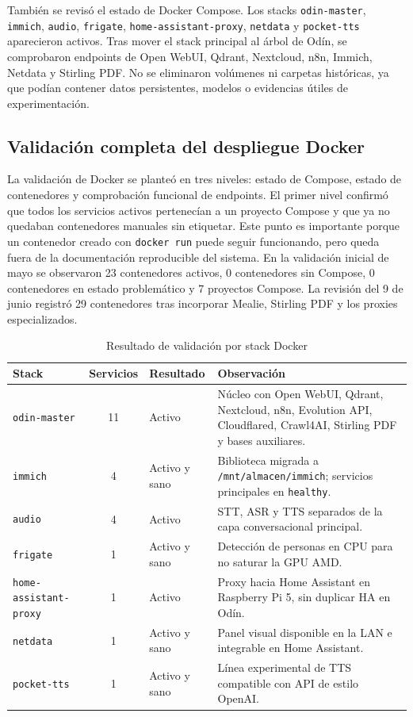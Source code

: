 También se revisó el estado de Docker Compose. Los stacks \texttt{odin-master}, \texttt{immich}, \texttt{audio}, \texttt{frigate}, \texttt{home-assistant-proxy}, \texttt{netdata} y \texttt{pocket-tts} aparecieron activos. Tras mover el stack principal al árbol de Odín, se comprobaron endpoints de Open WebUI, Qdrant, Nextcloud, n8n, Immich, Netdata y Stirling PDF. No se eliminaron volúmenes ni carpetas históricas, ya que podían contener datos persistentes, modelos o evidencias útiles de experimentación.

\subsection{Validación completa del despliegue Docker}
La validación de Docker se planteó en tres niveles: estado de Compose, estado de contenedores y comprobación funcional de endpoints. El primer nivel confirmó que todos los servicios activos pertenecían a un proyecto Compose y que ya no quedaban contenedores manuales sin etiquetar. Este punto es importante porque un contenedor creado con \texttt{docker run} puede seguir funcionando, pero queda fuera de la documentación reproducible del sistema. En la validación inicial de mayo se observaron 23 contenedores activos, 0 contenedores sin Compose, 0 contenedores en estado problemático y 7 proyectos Compose. La revisión del 9 de junio registró 29 contenedores tras incorporar Mealie, Stirling PDF y los proxies especializados.

\begin{table}[H]
  \centering
  \caption{Resultado de validación por stack Docker}
  \label{tab:validacion-stacks-docker}
  \begin{tabularx}{\textwidth}{l c X X}
    \toprule
    Stack & Servicios & Resultado & Observación \\
    \midrule
    \texttt{odin-master} & 11 & Activo & Núcleo con Open WebUI, Qdrant, Nextcloud, n8n, Evolution API, Cloudflared, Crawl4AI, Stirling PDF y bases auxiliares. \\
    \texttt{immich} & 4 & Activo y sano & Biblioteca migrada a \nolinkurl{/mnt/almacen/immich}; servicios principales en \texttt{healthy}. \\
    \texttt{audio} & 4 & Activo & STT, ASR y TTS separados de la capa conversacional principal. \\
    \texttt{frigate} & 1 & Activo y sano & Detección de personas en CPU para no saturar la GPU AMD. \\
    \texttt{home-assistant-proxy} & 1 & Activo & Proxy hacia Home Assistant en Raspberry Pi 5, sin duplicar HA en Odín. \\
    \texttt{netdata} & 1 & Activo y sano & Panel visual disponible en la LAN e integrable en Home Assistant. \\
    \texttt{pocket-tts} & 1 & Activo y sano & Línea experimental de TTS compatible con API de estilo OpenAI. \\
    \bottomrule
  \end{tabularx}
\end{table}

